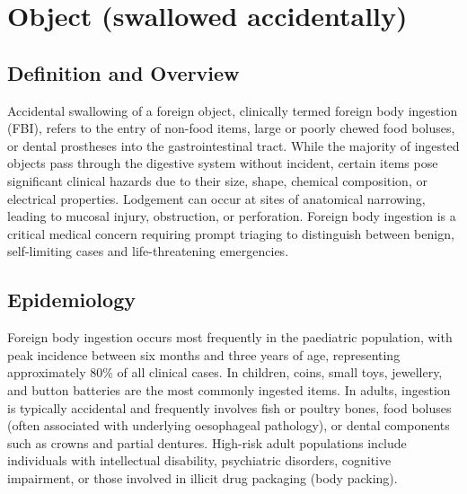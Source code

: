 \chapter{Object (swallowed accidentally)}

\section*{Definition and Overview}
Accidental swallowing of a foreign object, clinically termed foreign body ingestion (FBI), refers to the entry of non-food items, large or poorly chewed food boluses, or dental prostheses into the gastrointestinal tract. While the majority of ingested objects pass through the digestive system without incident, certain items pose significant clinical hazards due to their size, shape, chemical composition, or electrical properties. Lodgement can occur at sites of anatomical narrowing, leading to mucosal injury, obstruction, or perforation. Foreign body ingestion is a critical medical concern requiring prompt triaging to distinguish between benign, self-limiting cases and life-threatening emergencies.

\section*{Epidemiology}
Foreign body ingestion occurs most frequently in the paediatric population, with peak incidence between six months and three years of age, representing approximately 80\% of all clinical cases. In children, coins, small toys, jewellery, and button batteries are the most commonly ingested items. In adults, ingestion is typically accidental and frequently involves fish or poultry bones, food boluses (often associated with underlying oesophageal pathology), or dental components such as crowns and partial dentures. High-risk adult populations include individuals with intellectual disability, psychiatric disorders, cognitive impairment, or those involved in illicit drug packaging (body packing).

